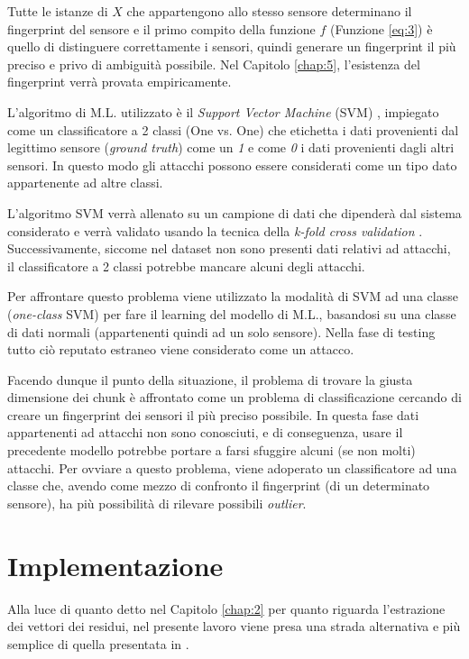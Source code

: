 \documentclass[Lau,binding=0.6cm,noexaminfo]{sapthesis}
\begin{document}
Tutte le istanze di $X$ che appartengono allo stesso sensore determinano il fingerprint del sensore e il primo compito della funzione $f$ (Funzione \ref{eq:3}) \`e quello di distinguere correttamente i sensori, 
quindi generare un fingerprint il pi\`u preciso e privo di ambiguit\`a possibile. Nel Capitolo \ref{chap:5}, l'esistenza del fingerprint verr\`a provata empiricamente.

L'algoritmo di M.L. utilizzato \`e il \textit{Support Vector Machine} (SVM) \cite{noble2006support}, impiegato come un classificatore a 2 classi (One vs. One) che etichetta i dati provenienti dal legittimo sensore (\textit{ground truth}) come un \textit{1}
e come \textit{0} i dati provenienti dagli altri sensori. In questo modo gli attacchi possono essere considerati come un tipo dato appartenente ad altre classi.

L'algoritmo SVM verr\`a allenato su un campione di dati che dipender\`a dal sistema considerato e verr\`a validato usando la tecnica della \textit{k-fold cross validation} \cite{refaeilzadeh2009cross}.
Successivamente, siccome nel dataset non sono presenti dati relativi ad attacchi, il classificatore a 2 classi potrebbe mancare alcuni degli attacchi.

Per affrontare questo problema viene utilizzato la modalit\`a di SVM ad una classe (\textit{one-class} SVM) per fare il learning del modello di M.L., basandosi su una classe di dati normali (appartenenti quindi ad un solo sensore). 
Nella fase di testing tutto ci\`o reputato estraneo viene considerato come un attacco.

Facendo dunque il punto della situazione, il problema di trovare la giusta dimensione dei chunk \`e affrontato come un problema di classificazione cercando di creare un fingerprint dei sensori il pi\`u preciso possibile.
In questa fase dati appartenenti ad attacchi non sono conosciuti, e di conseguenza, usare il precedente modello potrebbe portare a farsi sfuggire alcuni (se non molti) attacchi.
Per ovviare a questo problema, viene adoperato un classificatore ad una classe che, avendo come mezzo di confronto il fingerprint (di un determinato sensore), ha pi\`u possibilit\`a di rilevare possibili \textit{outlier}.


\chapter{Implementazione}\label{chap:4}
Alla luce di quanto detto nel Capitolo \ref{chap:2} per quanto riguarda l'estrazione dei vettori dei residui, nel presente lavoro viene presa una strada alternativa e pi\`u semplice di quella presentata in \cite{ahmed2018noise}.
\end{document}
